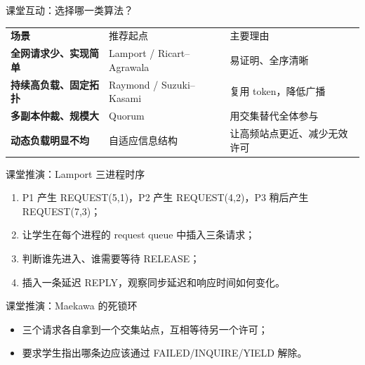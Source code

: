 \documentclass[UTF8,fontset=none,aspectratio=169,10pt]{beamer}
\begin{document}
\begin{frame}{课堂互动：选择哪一类算法？}
\begin{tabularx}{\linewidth}{>{\bfseries}p{3.2cm}XX}
\toprule
场景 & 推荐起点 & 主要理由 \\
全网请求少、实现简单 & Lamport / Ricart--Agrawala & 易证明、全序清晰 \\
持续高负载、固定拓扑 & Raymond / Suzuki--Kasami & 复用 token，降低广播 \\
多副本仲裁、规模大 & Quorum & 用交集替代全体参与 \\
动态负载明显不均 & 自适应信息结构 & 让高频站点更近、减少无效许可 \\
\bottomrule
\end{tabularx}
\end{frame}

\begin{frame}{课堂推演：Lamport 三进程时序}
\begin{enumerate}
  \item P1 产生 REQUEST(5,1)，P2 产生 REQUEST(4,2)，P3 稍后产生 REQUEST(7,3)；
  \item 让学生在每个进程的 request queue 中插入三条请求；
  \item 判断谁先进入、谁需要等待 RELEASE；
  \item 插入一条延迟 REPLY，观察同步延迟和响应时间如何变化。
\end{enumerate}
\end{frame}

\begin{frame}{课堂推演：Maekawa 的死锁环}
\begin{center}
\end{center}
\begin{itemize}
  \item 三个请求各自拿到一个交集站点，互相等待另一个许可；
  \item 要求学生指出哪条边应该通过 FAILED/INQUIRE/YIELD 解除。
\end{itemize}
\end{frame}
\end{document}
